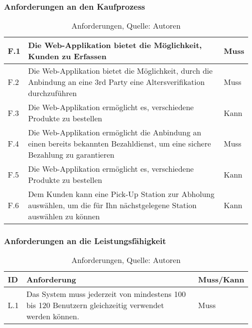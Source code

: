 \subsubsection{Anforderungen an den Kaufprozess}
\begin{table}[H]
    \setlength\extrarowheight{2pt} %
    \begin{tabularx}{\textwidth}{|l|X|l|}
    	\hline
        F.1 & Die Web-Applikation bietet die Möglichkeit, Kunden zu Erfassen & Muss \\
		\hline
		F.2 & Die Web-Applikation bietet die Möglichkeit, durch die Anbindung an eine 3rd Party eine Altersverifikation durchzuführen  & Muss \\
		\hline
		F.3 & Die Web-Applikation ermöglicht es, verschiedene Produkte zu bestellen & Kann \\
		\hline
		F.4 & Die Web-Applikation ermöglicht die Anbindung an einen bereits bekannten Bezahldienst, um eine sichere Bezahlung zu garantieren & Muss \\
		\hline
		F.5 & Die Web-Applikation ermöglicht es, verschiedene Produkte zu bestellen & Kann \\
		\hline
		F.6 & Dem Kunden kann eine Pick-Up Station zur Abholung auswählen, um die für Ihn nächstgelegene Station auswählen zu können  & Kann \\
		\hline
    \end{tabularx}
    \caption{ \label{tbl: Anforderungen an die Benutzbarkeit}Anforderungen, Quelle: Autoren}
\end{table}
\subsubsection{Anforderungen an die Leistungsfähigkeit}
\begin{table}[H]
    \setlength\extrarowheight{2pt} %
    \begin{tabularx}{\textwidth}{|l|X|l|}
        \hline
        \textbf{ID} &  \textbf{Anforderung} & \textbf{Muss/Kann}  \\
        \hline
        L.1 & Das System muss jederzeit von mindestens 100 bis 120 Benutzern gleichzeitig verwendet werden können. & Muss \\
        \hline
 \end{tabularx}
    \caption{ \label{tbl: Anforderungen an die Leistungsfaehigkeit}Anforderungen, Quelle: Autoren}
\end{table}
